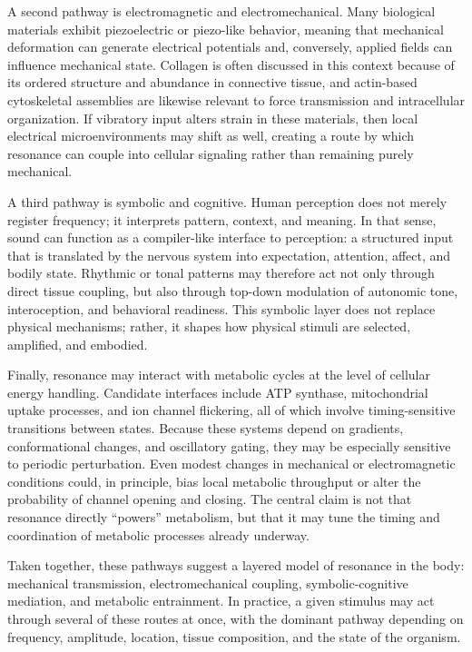 \documentclass[11pt]{article}
\begin{document}
A second pathway is electromagnetic and electromechanical. Many biological materials exhibit piezoelectric or piezo-like behavior, meaning that mechanical deformation can generate electrical potentials and, conversely, applied fields can influence mechanical state. Collagen is often discussed in this context because of its ordered structure and abundance in connective tissue, and actin-based cytoskeletal assemblies are likewise relevant to force transmission and intracellular organization. If vibratory input alters strain in these materials, then local electrical microenvironments may shift as well, creating a route by which resonance can couple into cellular signaling rather than remaining purely mechanical.

A third pathway is symbolic and cognitive. Human perception does not merely register frequency; it interprets pattern, context, and meaning. In that sense, sound can function as a compiler-like interface to perception: a structured input that is translated by the nervous system into expectation, attention, affect, and bodily state. Rhythmic or tonal patterns may therefore act not only through direct tissue coupling, but also through top-down modulation of autonomic tone, interoception, and behavioral readiness. This symbolic layer does not replace physical mechanisms; rather, it shapes how physical stimuli are selected, amplified, and embodied.

Finally, resonance may interact with metabolic cycles at the level of cellular energy handling. Candidate interfaces include ATP synthase, mitochondrial uptake processes, and ion channel flickering, all of which involve timing-sensitive transitions between states. Because these systems depend on gradients, conformational changes, and oscillatory gating, they may be especially sensitive to periodic perturbation. Even modest changes in mechanical or electromagnetic conditions could, in principle, bias local metabolic throughput or alter the probability of channel opening and closing. The central claim is not that resonance directly ``powers'' metabolism, but that it may tune the timing and coordination of metabolic processes already underway.

Taken together, these pathways suggest a layered model of resonance in the body: mechanical transmission, electromechanical coupling, symbolic-cognitive mediation, and metabolic entrainment. In practice, a given stimulus may act through several of these routes at once, with the dominant pathway depending on frequency, amplitude, location, tissue composition, and the state of the organism.
\end{document}
